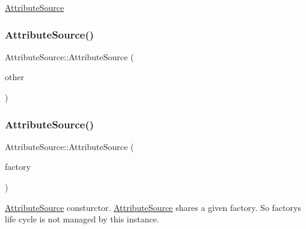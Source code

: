\mbox{\hyperlink{classlucene_1_1core_1_1util_1_1AttributeSource}{Attribute\+Source}} \mbox{\label{classlucene_1_1core_1_1util_1_1AttributeSource_a46285603ecad877610be674c124fd632}} 
\subsubsection{\texorpdfstring{Attribute\+Source()}{AttributeSource()}\hspace{0.1cm}{\footnotesize\ttfamily [2/3]}}
{\footnotesize\ttfamily Attribute\+Source\+::\+Attribute\+Source (\begin{DoxyParamCaption}\item[{\mbox{\hyperlink{ZlibCrc32_8h_a2c212835823e3c54a8ab6d95c652660e}{const}} \mbox{\hyperlink{classlucene_1_1core_1_1util_1_1AttributeSource}{Attribute\+Source}} \&}]{other }\end{DoxyParamCaption})}

\mbox{\label{classlucene_1_1core_1_1util_1_1AttributeSource_a3111b8c073c694240c1797420c7031a3}} 
\subsubsection{\texorpdfstring{Attribute\+Source()}{AttributeSource()}\hspace{0.1cm}{\footnotesize\ttfamily [3/3]}}
{\footnotesize\ttfamily Attribute\+Source\+::\+Attribute\+Source (\begin{DoxyParamCaption}\item[{\mbox{\hyperlink{classlucene_1_1core_1_1util_1_1AttributeFactory}{Attribute\+Factory}} \&}]{factory }\end{DoxyParamCaption})\hspace{0.3cm}{\ttfamily [explicit]}}

\mbox{\hyperlink{classlucene_1_1core_1_1util_1_1AttributeSource}{Attribute\+Source}} consturctor. \mbox{\hyperlink{classlucene_1_1core_1_1util_1_1AttributeSource}{Attribute\+Source}} shares a given factory. So factory\textquotesingle{}s life cycle is not managed by this instance. 

